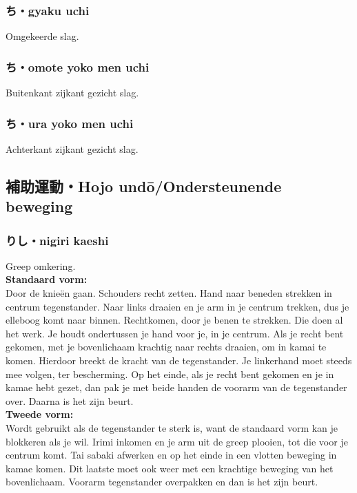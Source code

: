 \subsubsection{ち・gyaku uchi}
Omgekeerde slag.

\subsubsection{ち・omote yoko men uchi}
Buitenkant zijkant gezicht slag.

\subsubsection{ち・ura yoko men uchi}
Achterkant zijkant gezicht slag.

\subsection{補助運動・Hojo und\={o}/Ondersteunende beweging}
\subsubsection{りし・nigiri kaeshi}
Greep omkering.\\
\noindent \textbf{Standaard vorm:}\\
\noindent Door de knie\"{e}n gaan. Schouders recht zetten. Hand naar beneden strekken in centrum tegenstander. Naar links draaien en je arm in je centrum trekken, dus je elleboog komt naar binnen. Rechtkomen, door je benen te strekken. Die doen al het werk. Je houdt ondertussen je hand voor je, in je centrum. Als je recht bent gekomen, met je bovenlichaam krachtig naar rechts draaien, om in  kamai te komen. Hierdoor breekt de kracht van de tegenstander. Je linkerhand moet steeds mee volgen, ter bescherming. Op het einde, als je recht bent gekomen en je in kamae hebt gezet, dan pak je met beide handen de voorarm van de tegenstander over. Daarna is het zijn beurt.\\
\textbf{Tweede vorm:}\\
\noindent Wordt gebruikt als de tegenstander te sterk is, want de standaard vorm kan je blokkeren als je wil. Irimi inkomen en je arm uit de greep plooien, tot die voor je centrum komt. Tai sabaki afwerken en op het einde in een vlotten beweging in kamae komen. Dit laatste moet ook weer met een krachtige beweging van het bovenlichaam. Voorarm tegenstander overpakken en dan is het zijn beurt.

